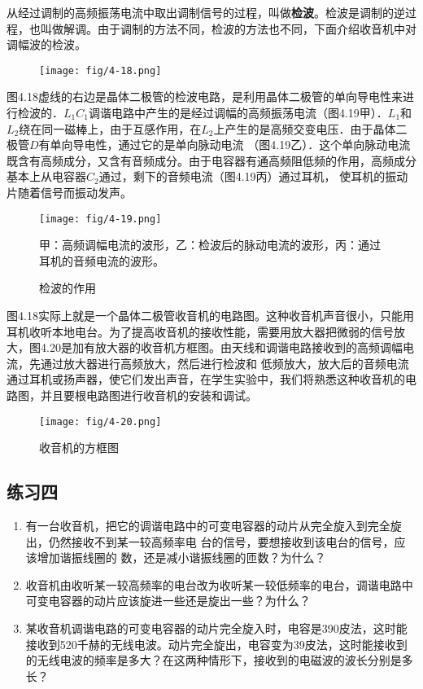 从经过调制的高频振荡电流中取出调制信号的过程，叫做\textbf{检波}。检波是调制的逆过程，也叫做解调。由于调制的方法不同，检波的方法也不同，下面介绍收音机中对调幅波的检波。
\begin{figure}[htp]\centering
\texttt{[image: fig/4-18.png]}
\caption{}
\end{figure}

图4.18虚线的右边是晶体二极管的检波电路，是利用晶体二极管的单向导电性来进行检波的．$L_1C_1$调谐电路中产生的是经过调幅的高频振荡电流（图4.19甲）．$L_1$和$L_2$绕在同一磁棒上，由于互感作用，在$L_2$上产生的是高频交变电压．由于晶体二极管$D$有单向导电性，通过它的是单向脉动电流
（图4.19乙）．这个单向脉动电流既含有高频成分，又含有音频成分。由于电容器有通高频阻低频的作用，高频成分基本上从电容器$C_2$通过，剩下的音频电流（图4.19丙）通过耳机，
使耳机的振动片随着信号而振动发声。
\begin{figure}[htp]\centering
\texttt{[image: fig/4-19.png]}
\caption{检波的作用}
甲：高频调幅电流的波形，乙：检波后的脉动电流的波形，丙：通过耳机的音频电流的波形。
\end{figure}

图4.18实际上就是一个晶体二极管收音机的电路图。这种收音机声音很小，只能用耳机收听本地电台。为了提高收音机的接收性能，需要用放大器把微弱的信号放大，图4.20是加有放大器的收音机方框图。由天线和调谐电路接收到的高频调幅电流，先通过放大器进行高频放大，然后进行检波和
低频放大，放大后的音频电流通过耳机或扬声器，使它们发出声音，在学生实验中，我们将熟悉这种收音机的电路图，并且要根电路图进行收音机的安装和调试。
\begin{figure}[htp]\centering
\texttt{[image: fig/4-20.png]}
\caption{收音机的方框图}
\end{figure}


\subsection*{练习四}
\begin{enumerate}
	\item 有一台收音机，把它的调谐电路中的可变电容器的动片从完全旋入到完全旋出，仍然接收不到某一较高频率电
	台的信号，要想接收到该电台的信号，应该增加谐振线圈的
	数，还是减小谐振线圈的匝数？为什么？
	\item 收音机由收听某一较高频率的电台改为收听某一较低频率的电台，调谐电路中可变电容器的动片应该旋进一些还是旋出一些？为什么？
	\item 某收音机调谐电路的可变电容器的动片完全旋入时，电容是390皮法，这时能接收到520千赫的无线电波。动片完全旋出，电容变为39皮法，这时能接收到的无线电波的频率是多大？在这两种情形下，接收到的电磁波的波长分别是多长？
\end{enumerate}

